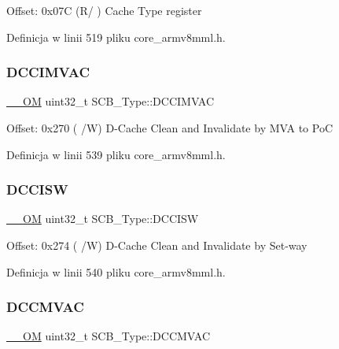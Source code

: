 Offset\+: 0x07C (R/ ) Cache Type register 

Definicja w linii 519 pliku core\+\_\+armv8mml.\+h.

\mbox{\label{struct_s_c_b___type_a4f59813582b53feb5f1afbbad3db2022}} 
\subsubsection{\texorpdfstring{D\+C\+C\+I\+M\+V\+AC}{DCCIMVAC}}
{\footnotesize\ttfamily \hyperlink{core__sc300_8h_a0ea2009ed8fd9ef35b48708280fdb758}{\+\_\+\+\_\+\+OM} uint32\+\_\+t S\+C\+B\+\_\+\+Type\+::\+D\+C\+C\+I\+M\+V\+AC}

Offset\+: 0x270 ( /W) D-\/\+Cache Clean and Invalidate by M\+VA to PoC 

Definicja w linii 539 pliku core\+\_\+armv8mml.\+h.

\mbox{\label{struct_s_c_b___type_af50f7a0a9574fe0e24a68bb4eca75140}} 
\subsubsection{\texorpdfstring{D\+C\+C\+I\+SW}{DCCISW}}
{\footnotesize\ttfamily \hyperlink{core__sc300_8h_a0ea2009ed8fd9ef35b48708280fdb758}{\+\_\+\+\_\+\+OM} uint32\+\_\+t S\+C\+B\+\_\+\+Type\+::\+D\+C\+C\+I\+SW}

Offset\+: 0x274 ( /W) D-\/\+Cache Clean and Invalidate by Set-\/way 

Definicja w linii 540 pliku core\+\_\+armv8mml.\+h.

\mbox{\label{struct_s_c_b___type_a042e3622c98de4e908cfda4f70d1f097}} 
\subsubsection{\texorpdfstring{D\+C\+C\+M\+V\+AC}{DCCMVAC}}
{\footnotesize\ttfamily \hyperlink{core__sc300_8h_a0ea2009ed8fd9ef35b48708280fdb758}{\+\_\+\+\_\+\+OM} uint32\+\_\+t S\+C\+B\+\_\+\+Type\+::\+D\+C\+C\+M\+V\+AC}

